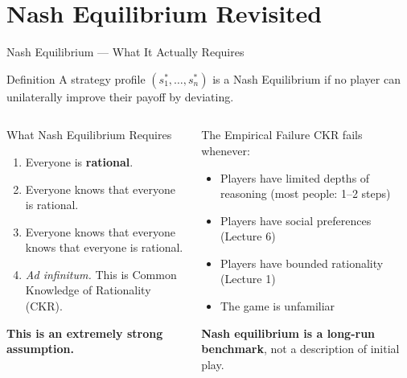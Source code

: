 \documentclass[aspectratio=169]{beamer}
\begin{document}
\section{Nash Equilibrium Revisited}

\begin{frame}{Nash Equilibrium --- What It Actually Requires}
\begin{block}{Definition}
A strategy profile $(s_1^*, \ldots, s_n^*)$ is a Nash Equilibrium if no player can unilaterally improve their payoff by deviating.
\end{block}
\begin{columns}
\begin{alertblock}{What Nash Equilibrium Requires}
\begin{enumerate}
  \item Everyone is \textbf{rational}.
  \item Everyone knows that everyone is rational.
  \item Everyone knows that everyone knows that everyone is rational.
  \item \textit{Ad infinitum.} This is \alert{Common Knowledge of Rationality (CKR)}.
\end{enumerate}
\textbf{This is an extremely strong assumption.}
\end{alertblock}
\begin{exampleblock}{The Empirical Failure}
CKR fails whenever:
\begin{itemize}
  \item Players have limited depths of reasoning (most people: 1--2 steps)
  \item Players have social preferences (Lecture 6)
  \item Players have bounded rationality (Lecture 1)
  \item The game is unfamiliar
\end{itemize}
\textbf{Nash equilibrium is a long-run benchmark}, not a description of initial play.
\end{exampleblock}
\end{columns}
\end{frame}
\end{document}
